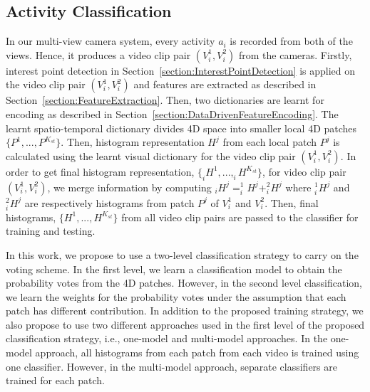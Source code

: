 \documentclass[a4paper, 10pt, conference]{ieeeconf}      %
\begin{document}
\subsection{Activity Classification}
\label{section:ActionClassification}

	In our multi-view camera system, every activity $a_{i}$ is recorded from both of the views. Hence, it produces a video clip pair $\left(V_{i}^{1},V_{i}^{2}\right)$ from the cameras. Firstly, interest point detection in Section~\ref{section:InterestPointDetection} is applied on the video clip pair $\left(V_{i}^{1},V_{i}^{2}\right)$ and features are extracted as described in Section~\ref{section:FeatureExtraction}. Then, two dictionaries are learnt for encoding as described in Section~\ref{section:DataDrivenFeatureEncoding}. The learnt spatio-temporal dictionary divides 4D space into smaller local 4D patches $\{P^{1},...,P^{K_{st}}\}$. Then, histogram representation $H^{j}$ from each local patch $P^{j}$ is calculated using the learnt visual dictionary for the video clip pair $\left(V_{i}^{1}, V_{i}^{2}\right)$. In order to get final histogram representation, $\{_{i}H^{1},..., _{i}H^{K_{st}}\}$, for video clip pair $\left(V_{i}^{1},V_{i}^{2}\right)$, we merge information by computing $_{i}H^{j} = _{i}^{1}H^{j} + _{i}^{2}H^{j}$ where $_{i}^{1}H^{j}$ and $_{i}^{2}H^{j}$ are respectively histograms from patch $P^{j}$ of $V_{i}^{1}$ and $V_{i}^{2}$. Then, final histograms, $\{H^{1},..., H^{K_{st}}\}$ from all video clip pairs are passed to the classifier for training and testing. 
    


In this work, we propose to use a two-level classification strategy to carry on the voting scheme. In the first level, we learn a classification model to obtain the probability votes from the 4D patches. However, in the second level classification, we learn the weights for the probability votes under the assumption that each patch has different contribution. In addition to the proposed training strategy, we also propose to use two different approaches used in the first level of the proposed classification strategy, i.e., one-model and multi-model approaches. In the one-model approach, all histograms from each patch from each video is trained using one classifier. However, in the multi-model approach, separate classifiers are trained for each patch.
\end{document}
